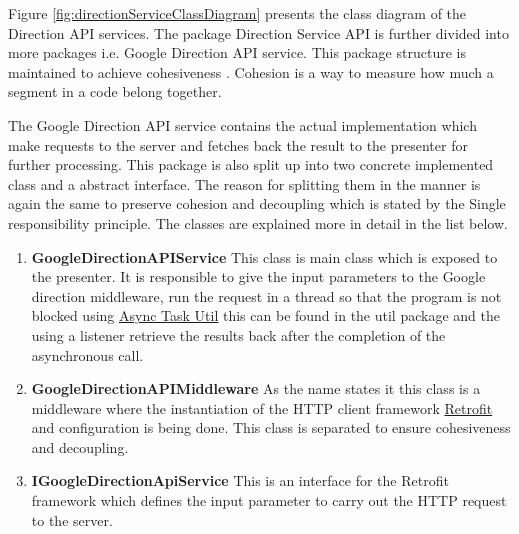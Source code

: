     \par
        Figure \ref{fig:directionServiceClassDiagram} presents the class diagram
        of the Direction API services. The package Direction Service API is further divided 
        into more packages i.e. Google Direction API service. This package 
        structure is maintained to achieve cohesiveness \cite{AdamCarlson}. Cohesion
        is a way to measure how much a segment in a code belong together. 
        
        \par
        The Google Direction API service contains the actual implementation 
        which make requests to the server and fetches back the result to the 
        presenter \cite{mvp} for further processing. This package is also split up into 
        two concrete implemented class and a abstract interface. The reason
        for splitting them in the manner is again the same to preserve cohesion
        and decoupling which is stated by the Single responsibility principle.
        The classes are explained more in detail in the list below. 
        \begin{enumerate}
            \item 
            \textbf{GoogleDirectionAPIService}
                This class is main class which is exposed to the presenter. It is
                responsible to give the input parameters to the Google direction 
                middleware, run the request in a thread so that the program is not
                blocked using \href{https://developer.android.com/reference/android/os/AsyncTask.html}
                {Async Task Util} this can be found in the util package and the using a listener
                retrieve the results back after the completion of the asynchronous call.
            \item 
            \textbf{GoogleDirectionAPIMiddleware}
                As the name states it this class is a middleware where the instantiation
                of the HTTP client framework \href{http://square.github.io/retrofit/} 
                {Retrofit} and configuration is being done. This class is separated 
                to ensure cohesiveness and decoupling.
            \item 
            \textbf{IGoogleDirectionApiService}
                This is an interface for the Retrofit framework which defines the input
                parameter to carry out the HTTP request to the server.
        \end{enumerate} 

